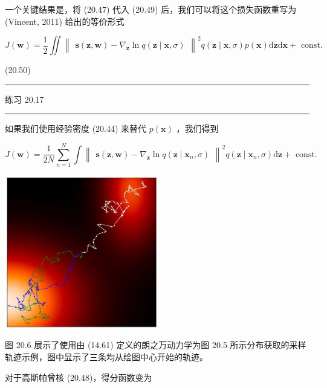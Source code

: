 \documentclass[10pt]{report}
\newcommand{\HRule}{\begin{center}\rule{0.9\linewidth}{0.2mm}\end{center}}
\begin{document}
一个关键结果是，将 (20.47) 代入 (20.49) 后，我们可以将这个损失函数重写为 (Vincent, 2011) 给出的等价形式

\[
J\left( \mathbf{w}\right)  = \frac{1}{2}\iint {\begin{Vmatrix}\mathbf{s}\left( \mathbf{z},\mathbf{w}\right)  - {\nabla }_{\mathbf{z}}\ln q\left( \mathbf{z} \mid  \mathbf{x},\sigma \right) \end{Vmatrix}}^{2}q\left( {\mathbf{z} \mid  \mathbf{x},\sigma }\right) p\left( \mathbf{x}\right) \mathrm{d}\mathbf{z}\mathrm{d}\mathbf{x} + \text{ const. }
\]

(20.50)

\HRule

练习 20.17

\HRule

如果我们使用经验密度 (20.44) 来替代 \(p\left( \mathbf{x}\right)\) ，我们得到

\[
J\left( \mathbf{w}\right)  = \frac{1}{2N}\mathop{\sum }\limits_{{n = 1}}^{N}\int {\begin{Vmatrix}\mathbf{s}\left( \mathbf{z},\mathbf{w}\right)  - {\nabla }_{\mathbf{z}}\ln q\left( \mathbf{z} \mid  {\mathbf{x}}_{n},\sigma \right) \end{Vmatrix}}^{2}q\left( {\mathbf{z} \mid  {\mathbf{x}}_{n},\sigma }\right) \mathrm{d}\mathbf{z} + \text{ const. } \tag{20.51}
\]

\begin{center}
\includegraphics[max width=0.5\textwidth]{images/0194e279-9b28-703a-88f4-c3ac21e2010d_616_925_348_623_625_0.jpg}
\end{center}
\hspace*{3em} 

图 20.6 展示了使用由 (14.61) 定义的朗之万动力学为图 20.5 所示分布获取的采样轨迹示例，图中显示了三条均从绘图中心开始的轨迹。

对于高斯帕曾核 (20.48)，得分函数变为
\end{document}
